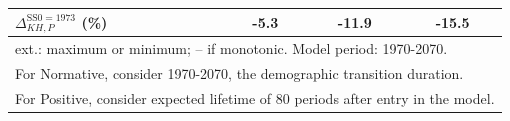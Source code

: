 \begin{table}[htbp]
\begin{tabular}{l ccc ccc ccc}
\(\Delta_{KH,P}^{\mathrm{SS0=1973}}\) (\%) & \multicolumn{3}{c}{-5.3} & \multicolumn{3}{c}{-11.9} & \multicolumn{3}{c}{-15.5} \\
\bottomrule
\multicolumn{10}{l}{\footnotesize ext.: maximum or minimum; -- if monotonic. Model period: 1970-2070.} \\
\multicolumn{10}{l}{\footnotesize For Normative, consider 1970-2070, the demographic transition duration.} \\
\multicolumn{10}{l}{\footnotesize For Positive, consider expected lifetime of 80 periods after entry in the model.} \\
\end{tabular}
\end{table}
